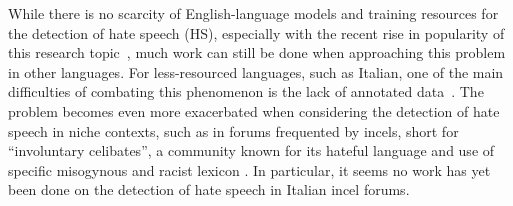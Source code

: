 \documentclass[11pt]{article}
\newcommand{\abc}[1]{{\color{blue} #1}}
\newcommand{\paolo}[1]{{\color{red} #1}}
\begin{document}

While there is no scarcity of English-language models and training resources for
the detection of hate speech \paolo{(HS)}, especially with the recent rise in popularity of
this research topic~\cite{alkomahLiteratureReviewTextual2022},
much work can still be done when approaching this problem in other languages.
For less-resourced languages, such as Italian, one of the main difficulties of combating this phenomenon is the lack of annotated data~\cite{van2023mitigating}. The problem becomes even more
exacerbated when considering the detection of hate speech in niche contexts,
such as in forums frequented by incels,
short for ``involuntary celibates'', a community known for its hateful language \cite{nagle-2017-kill-normies,jakiOnlineHatredWomen2019}
and use of
specific misogynous and racist lexicon \abc{\cite{farrellExploringMisogynyManosphere2019,gothard2020exploring}.}
In particular, it seems no work has yet been done on the detection of hate speech in Italian incel forums.
\end{document}
